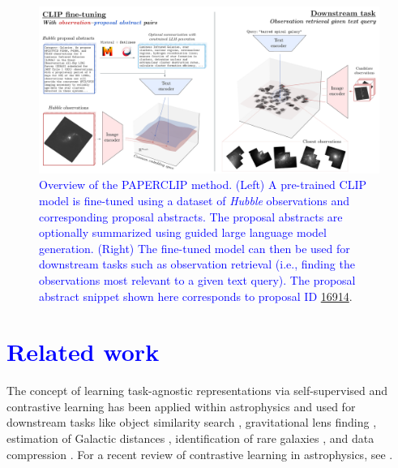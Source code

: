\documentclass[10pt]{article} %
\newcommand{\hubble}{\emph{Hubble}\xspace}
\newcommand{\changes}[1]{\textcolor{blue}{#1}}
\begin{document}
\begin{figure}[!t]
\centering
\includegraphics[width=0.99\textwidth]{plots/figure.pdf}
\caption{\changes{Overview of the PAPERCLIP method. (Left) A pre-trained CLIP model is fine-tuned using a dataset of \hubble observations and corresponding proposal abstracts. The proposal abstracts are optionally summarized using guided large language model generation. (Right) The fine-tuned model can then be used for downstream tasks such as observation retrieval (i.e., finding the observations most relevant to a given text query). The proposal abstract snippet shown here corresponds to proposal ID \href{https://archive.stsci.edu/proposal_search.php?id=16914&mission=hst}{16914}}.}
\label{fig:overview}
\end{figure}

\section{\changes{Related work}}

%
The concept of learning task-agnostic representations via self-supervised and contrastive learning has been applied within astrophysics \citep{slijepcevic2024radio,stein2021self,hayat2021self,slijepcevic2022learning} and used for downstream tasks like object similarity search \citep{stein2021self}, gravitational lens finding \citep{stein2022mining}, estimation of Galactic distances \citep{hayat2021estimating}, identification of rare galaxies \citep{walmsley2023rare}, and data compression \citep{akhmetzhanova2024data}. For a recent review of contrastive learning in astrophysics, see \citet{huertas2023brief}. 
%
\end{document}
